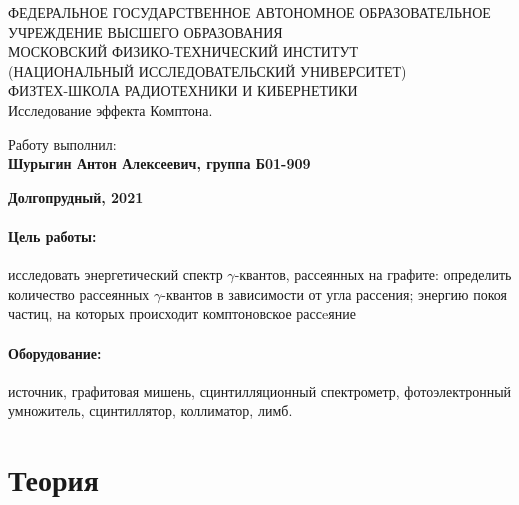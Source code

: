 \documentclass[15pt,a5paper,reqno]{article}
\begin{document}
\begin{center}
  {\small ФЕДЕРАЛЬНОЕ ГОСУДАРСТВЕННОЕ АВТОНОМНОЕ ОБРАЗОВАТЕЛЬНОЕ\\ УЧРЕЖДЕНИЕ ВЫСШЕГО ОБРАЗОВАНИЯ\\ МОСКОВСКИЙ ФИЗИКО-ТЕХНИЧЕСКИЙ ИНСТИТУТ\\ (НАЦИОНАЛЬНЫЙ ИССЛЕДОВАТЕЛЬСКИЙ УНИВЕРСИТЕТ)\\ ФИЗТЕХ-ШКОЛА РАДИОТЕХНИКИ И КИБЕРНЕТИКИ}\\
  \hfill \break
  \hfill \break
  \hfill \break
  \Huge{Исследование эффекта Комптона.}\\
\end{center}

\hfill \break
\hfill \break
\hfill \break
\hfill \break
\hfill \break
\hfill \break

\begin{flushright}
  \normalsize{Работу выполнил:}\\
  \normalsize{\textbf{Шурыгин Антон Алексеевич, группа Б01-909}}\\
\end{flushright}

\begin{center}
  \normalsize{\textbf{Долгопрудный, 2021}}
\end{center}


\thispagestyle{empty} %


\newpage
\thispagestyle{plain}
\tableofcontents
\thispagestyle{plain}
\newpage

\paragraph{Цель работы:} исследовать энергетический спектр $\gamma$-квантов, рассеянных на графите: определить количество рассеянных $\gamma$-квантов в зависимости от угла рассения; энергию покоя частиц, на которых происходит комптоновское рассeяние
\paragraph{Оборудование:} источник, графитовая мишень, сцинтилляционный спектрометр, фотоэлектронный умножитель, сцинтиллятор, коллиматор, лимб.


\section{Теория}
\end{document}
